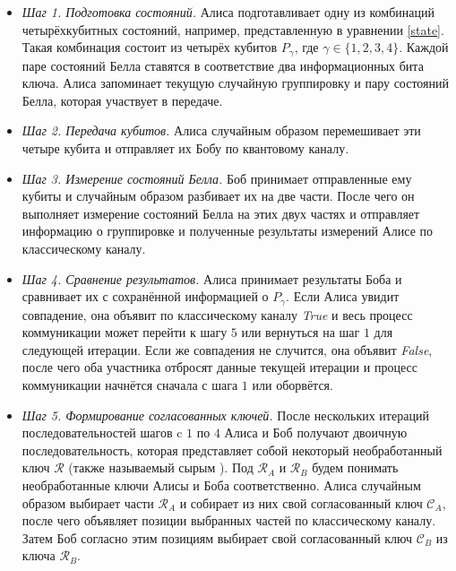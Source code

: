 \documentclass[a4paper,11pt]{article}
\begin{document}
\begin{itemize}

\item \textit{Шаг 1. Подготовка состояний.} Алиса подготавливает одну из комбинаций четырёхкубитных состояний, например, представленную в уравнении \eqref{state}. Такая комбинация состоит из четырёх кубитов $P_\gamma$, где $\gamma \in \{1,2,3,4\}$. Каждой паре состояний Белла ставятся в соответствие два информационных бита ключа. 
Алиса запоминает текущую случайную группировку и пару состояний Белла, которая участвует в передаче. %

\item \textit{Шаг 2. Передача кубитов.} Алиса случайным образом перемешивает эти четыре кубита и отправляет их Бобу по квантовому каналу.

\item \textit{Шаг 3. Измерение состояний Белла.} Боб принимает отправленные ему кубиты и случайным образом разбивает их на две части. После чего он выполняет измерение состояний Белла на этих двух частях и отправляет информацию о группировке и полученные результаты измерений Алисе по классическому каналу.

\item \textit{Шаг 4. Сравнение результатов.} Алиса принимает результаты Боба и сравнивает их с сохранённой информацией о $P_\gamma$. Если Алиса увидит совпадение, она объявит по классическому каналу \textit{True} и весь процесс коммуникации может перейти к шагу $5$ или вернуться на шаг $1$ для следующей итерации. Если же совпадения не случится, она объявит \textit{False}, после чего оба участника отбросят данные текущей итерации и процесс коммуникации начнётся сначала с шага $1$ или оборвётся. 

\item \textit{Шаг 5. Формирование согласованных ключей.} После нескольких итераций последовательностей шагов c $1$ по $4$ Алиса и Боб получают двоичную последовательность, которая представляет собой некоторый необработанный ключ $\mathcal{R}$ (также называемый сырым \cite{vmk}). Под $\mathcal{R}_A$ и $\mathcal{R}_B$ будем понимать необработанные ключи Алисы и Боба соответственно. Алиса случайным образом выбирает части $\mathcal{R}_A$ и собирает из них свой согласованный ключ $\mathcal{C}_A$, после чего объявляет позиции выбранных частей по классическому каналу. Затем Боб согласно этим позициям выбирает свой согласованный ключ $\mathcal{C}_B$ из ключа $\mathcal{R}_B$.


\end{itemize}
\end{document}
